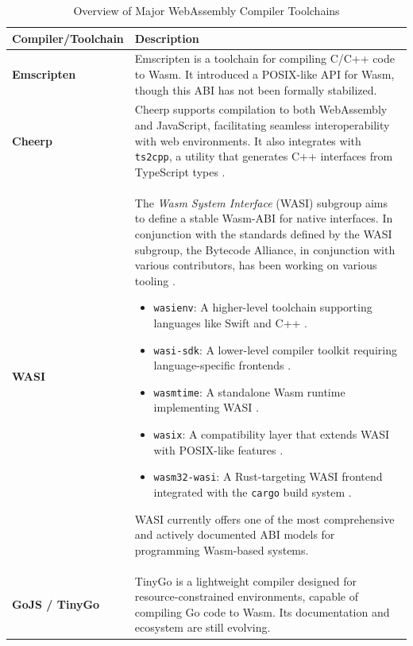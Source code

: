 \begin{table}[ht!]
  \centering
  \begin{tabular}{|l|p{15cm}|}
    \hline
    \textbf{Compiler/Toolchain} & \textbf{Description} \\ \hline

    \textbf{Emscripten} & Emscripten is a toolchain for compiling C/C++ code to Wasm. It introduced a POSIX-like API for Wasm, though this ABI has not been formally stabilized. \cite{Zakai2025emscripten} \\ \hline

    \textbf{Cheerp} & Cheerp supports compilation to both WebAssembly and JavaScript, facilitating seamless interoperability with web environments. It also integrates with \texttt{ts2cpp}, a utility that generates C++ interfaces from TypeScript types \cite{Piovesan2025leaningtech, DutChen182024leaningtech}. \\ \hline

    \textbf{WASI} & The \textit{Wasm System Interface} (WASI) subgroup \cite{wasi_dev} aims to define a stable Wasm-ABI for native interfaces. In conjunction with the standards defined by the WASI subgroup, the Bytecode Alliance, in conjunction with various contributors, has been working on various tooling \cite{bytecodealliance_projects}. 
    \begin{itemize}
      \item \texttt{wasienv}: A higher-level toolchain supporting languages like Swift and C++ \cite{Akbary2023wasienv}.
      \item \texttt{wasi-sdk}: A lower-level compiler toolkit requiring language-specific frontends \cite{Gohman2024WebAssembly}.
      \item \texttt{wasmtime}: A standalone Wasm runtime implementing WASI \cite{wasmtime_intro}.
      \item \texttt{wasix}: A compatibility layer that extends WASI with POSIX-like features \cite{wasix}.
      \item \texttt{wasm32-wasi}: A Rust-targeting WASI frontend integrated with the \texttt{cargo} build system \cite{cargo-wasi}.
    \end{itemize}
 WASI currently offers one of the most comprehensive and actively documented ABI models for programming Wasm-based systems. \\ \hline

    \textbf{GoJS / TinyGo} & TinyGo is a lightweight compiler designed for resource-constrained environments, capable of compiling Go code to Wasm. Its documentation and ecosystem are still evolving. \cite{Ayke2024tinygo} \\ \hline

  \end{tabular}
  \caption{Overview of Major WebAssembly Compiler Toolchains}
  \label{table:wasm_compilers}
\end{table}

